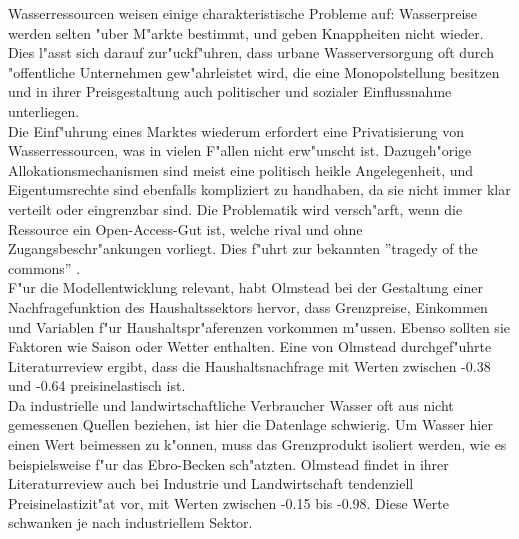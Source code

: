 \documentclass[11pt,a4paper]{article}
\begin{document}
Wasserressourcen weisen einige charakteristische Probleme auf: Wasserpreise werden selten "uber M"arkte bestimmt, und geben Knappheiten nicht wieder. Dies l"asst sich darauf zur"uckf"uhren, dass urbane Wasserversorgung oft durch "offentliche Unternehmen gew"ahrleistet wird, die eine Monopolstellung besitzen und in ihrer Preisgestaltung auch politischer und sozialer Einflussnahme unterliegen.\\
Die Einf"uhrung eines Marktes wiederum erfordert eine Privatisierung von Wasserressourcen, was in vielen F"allen nicht erw"unscht ist. Dazugeh"orige Allokationsmechanismen sind meist eine politisch heikle Angelegenheit, und Eigentumsrechte sind ebenfalls kompliziert zu handhaben, da sie nicht immer klar verteilt oder eingrenzbar sind. Die Problematik wird versch"arft, wenn die Ressource ein Open-Access-Gut ist, welche rival und ohne Zugangsbeschr"ankungen vorliegt. Dies f"uhrt zur bekannten ''tragedy of the commons'' \citep{Hardin1968}.\\

F"ur die Modellentwicklung relevant, habt Olmstead bei der Gestaltung einer Nachfragefunktion des Haushaltssektors hervor, dass Grenzpreise, Einkommen und Variablen f"ur Haus\-halts\-pr"a\-ferenzen vorkommen m"ussen. Ebenso sollten sie Faktoren wie Saison oder Wetter enthalten. Eine von Olmstead durchgef"uhrte Literaturreview ergibt, dass die Haushaltsnachfrage mit Werten zwischen -0.38 und -0.64 preis\-in\-elastisch ist.\\
Da industrielle und landwirtschaftliche Verbraucher Wasser oft aus nicht gemessenen Quellen beziehen, ist hier die Datenlage schwierig. Um Wasser hier einen Wert beimessen zu k"onnen, muss das Grenzprodukt isoliert werden, wie es beispielsweise \cite{Salvador2011} f"ur das Ebro-Becken sch"atzten. Olmstead findet in ihrer Literaturreview auch bei Industrie und Landwirtschaft tendenziell Preisinelastizit"at vor, mit Werten zwischen -0.15 bis -0.98. Diese Werte schwanken je nach industriellem Sektor.\\
\end{document}

